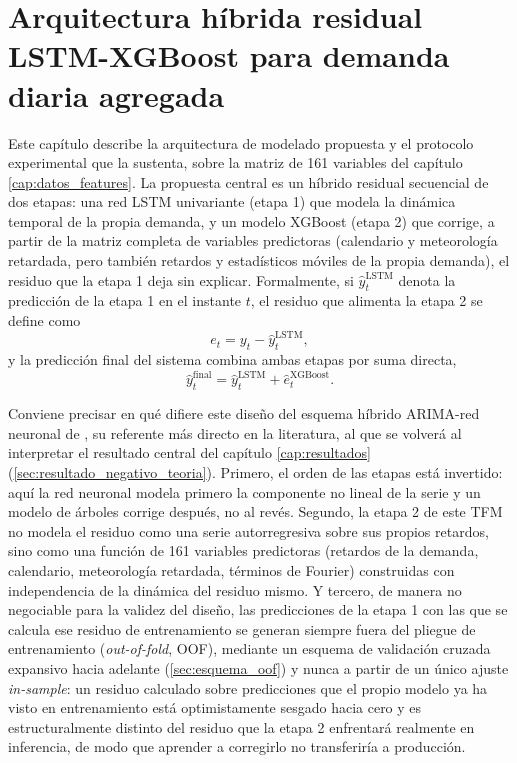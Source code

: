 \chapter{Arquitectura híbrida residual LSTM-XGBoost para demanda diaria agregada}\label{cap:metodologia}

Este capítulo describe la arquitectura de modelado propuesta y el protocolo experimental
que la sustenta, sobre la matriz de 161 variables del capítulo \ref{cap:datos_features}.
La propuesta central es un híbrido residual secuencial de dos etapas: una red LSTM
univariante (etapa 1) que modela la dinámica temporal de la propia demanda, y un modelo
XGBoost (etapa 2) que corrige, a partir de la matriz completa de variables predictoras
(calendario y meteorología retardada, pero también retardos y estadísticos móviles de la
propia demanda), el residuo que la etapa 1 deja sin explicar.
Formalmente, si
$\hat y^{\text{LSTM}}_t$ denota la predicción de la etapa 1 en el instante $t$, el residuo
que alimenta la etapa 2 se define como
\[
  e_t = y_t - \hat y^{\text{LSTM}}_t,
\]
y la predicción final del sistema combina ambas etapas por suma directa,
\[
  \hat y^{\text{final}}_t = \hat y^{\text{LSTM}}_t + \hat e^{\text{XGBoost}}_t .
\]

Conviene precisar en qué difiere este diseño del esquema híbrido ARIMA-red neuronal de
\textcite{zhang2003hybrid}, su referente más directo en la literatura, al que se volverá
al interpretar el resultado central del capítulo \ref{cap:resultados}
(\ref{sec:resultado_negativo_teoria}). Primero, el orden de las etapas está invertido:
aquí la red neuronal modela primero la componente no lineal de la serie y un modelo de
árboles corrige después, no al revés. Segundo, la etapa 2 de este TFM no modela el residuo
como una serie autorregresiva sobre sus propios retardos, sino como una función de 161
variables predictoras (retardos de la demanda, calendario, meteorología retardada,
términos de Fourier) construidas con independencia de la dinámica del residuo mismo. Y
tercero, de manera no negociable para la validez del diseño, las predicciones de la etapa
1 con las que se calcula ese residuo de entrenamiento se generan siempre fuera del pliegue
de entrenamiento (\emph{out-of-fold}, OOF), mediante un esquema de validación cruzada
expansivo hacia adelante (\ref{sec:esquema_oof}) y nunca a partir de un único ajuste
\emph{in-sample}: un residuo calculado sobre predicciones que el propio modelo ya ha visto
en entrenamiento está optimistamente sesgado hacia cero y es estructuralmente distinto del
residuo que la etapa 2 enfrentará realmente en inferencia, de modo que aprender a
corregirlo no transferiría a producción.

